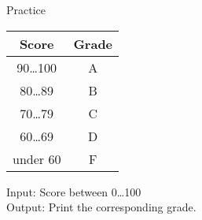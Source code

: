 \documentclass{beamer}
\begin{document}
\begin{frame}{Practice}
    \begin{tabular}{|*2c|}
      \hline
      Score & Grade \\\hline
      90\ldots100 & A \\
      80\ldots89 & B \\
      70\ldots79 & C \\
      60\ldots69 & D \\
      under 60 & F\\\hline
    \end{tabular}
    \bigskip

    Input: Score between 0\ldots100\\
    Output: Print the corresponding grade.
\end{frame}
\end{document}
